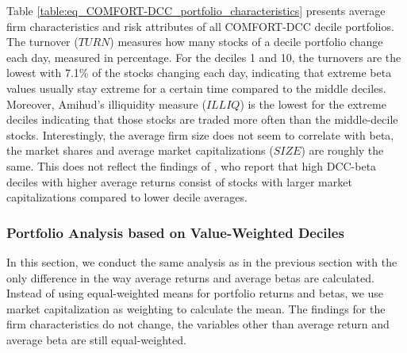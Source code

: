 \documentclass[11pt,a4paper]{article}
\begin{document}
Table \ref{table:eq_COMFORT-DCC_portfolio_characteristics} presents average firm characteristics and risk attributes of all COMFORT-DCC decile portfolios. The turnover ($\textit{TURN}$) measures how many stocks of a decile portfolio change each day, measured in percentage. For the deciles 1 and 10, the turnovers are the lowest with 7.1\% of the stocks changing each day, indicating that extreme beta values usually stay extreme for a certain time compared to the middle deciles. Moreover, Amihud's illiquidity measure ($\textit{ILLIQ}$) is the lowest for the extreme deciles indicating that those stocks are traded more often than the middle-decile stocks. Interestingly, the average firm size does not seem to correlate with beta, the market shares and average market capitalizations ($\textit{SIZE}$) are roughly the same. This does not reflect the findings of , who report that high DCC-beta deciles with higher average returns consist of stocks with larger market capitalizations compared to lower decile averages.





\subsubsection{Portfolio Analysis based on Value-Weighted Deciles}

In this section, we conduct the same analysis as in the previous section with the only difference in the way average returns and average betas are calculated. Instead of using equal-weighted means for portfolio returns and betas, we use market capitalization as weighting to calculate the mean. The findings for the firm characteristics do not change, the variables other than average return and average beta are still equal-weighted. \\
\end{document}
